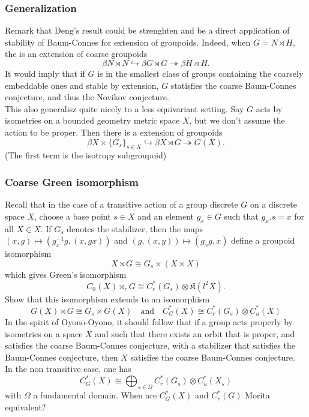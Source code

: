 \subsubsection*{Generalization}

Remark that Deng's result could be strenghten and be a direct application of stability of Baum-Connes for extension of groupoids. Indeed, when $G=N\rtimes H$, the is an extension of coarse groupoids
\[ \beta N \rtimes N\hookrightarrow  \beta G \rtimes G \twoheadrightarrow \beta H \rtimes H.\]
It would imply that if $G$ is in the smallest class of groups containing the coarsely embeddable ones and stable by extension, $G$ statisfies the coarse Baum-Connes conjecture, and thus the Novikov conjecture.\\

This also generalisz quite nicely to a less equivariant setting. Say $G$ acts by isometries on a bounded geometry metric space $X$, but we don't assume the action to be proper. Then there is a extension of groupoids
\[ \beta X \times \{G_s\}_{s\in X} \hookrightarrow  \beta X \rtimes G \twoheadrightarrow G(X).\]
(The first term is the isotropy subgroupoid)

\subsubsection*{Coarse Green isomorphism}

Recall that in the case of a transitive action of a group discrete $G$ on a discrete space $X$, choose a base point $s\in X$ and an element $g_x\in G$ such that $g_x .s =x$ for all $X\in X$. If $G_s$ denotes the stabilizer, then the maps $(x,g)\mapsto (g^{-1}_x g , (x , gx))$ and $(g, (x,y))\mapsto (g_x g, x) $ define a groupoid isomorphism
\[ X\rtimes G \cong G_s \times (X\times X)\]
which gives Green's isomorphism
\[C_0(X)\rtimes_r G \cong C^*_r(G_s) \otimes \mathfrak K(l^2 X).\]
Show that this isomorphism extends to an isomorphism
\[G(X)\rtimes G \cong G_s \times G(X) \quad \text{and} \quad 
C^*_G(X) \cong C_r^*(G_s) \otimes C^*_u(X)\]
In the spirit of Oyono-Oyono, it should follow that if a group acts properly by isometries on a space $X$ and such that there exists an orbit that is proper, and satisfies the coarse Baum-Connes conjecture, with a stabilizer that satisfies the Baum-Connes conjecture, then $X$ satisfies the coarse Baum-Connes conjecture. \\ 

In the non  transitive case, one has
\[ C^*_G(X) \cong \bigoplus_{s\in \Omega} C_r^*(G_s) \otimes C^*_u(X_s)\]
with $\Omega$ a fundamental domain. When are $C_G^*(X)$ and $C^*_r(G)$ Morita equivalent?

